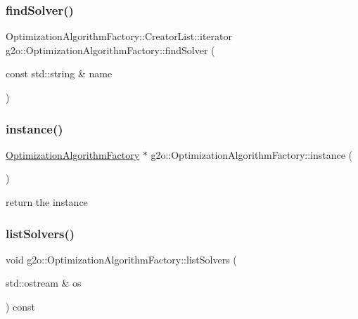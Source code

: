 \subsubsection{\texorpdfstring{find\+Solver()}{findSolver()}\hspace{0.1cm}{\footnotesize\ttfamily [2/2]}}
{\footnotesize\ttfamily Optimization\+Algorithm\+Factory\+::\+Creator\+List\+::iterator g2o\+::\+Optimization\+Algorithm\+Factory\+::find\+Solver (\begin{DoxyParamCaption}\item[{const std\+::string \&}]{name }\end{DoxyParamCaption})\hspace{0.3cm}{\ttfamily [protected]}}

\mbox{\label{classg2o_1_1_optimization_algorithm_factory_a4fe827a82f01c74ef124e7a9a9c98707}} 
\subsubsection{\texorpdfstring{instance()}{instance()}}
{\footnotesize\ttfamily \mbox{\hyperlink{classg2o_1_1_optimization_algorithm_factory}{Optimization\+Algorithm\+Factory}} $\ast$ g2o\+::\+Optimization\+Algorithm\+Factory\+::instance (\begin{DoxyParamCaption}{ }\end{DoxyParamCaption})\hspace{0.3cm}{\ttfamily [static]}}



return the instance 

\mbox{\label{classg2o_1_1_optimization_algorithm_factory_a89704fe7093e03eb4f2d568a1969bc45}} 
\subsubsection{\texorpdfstring{list\+Solvers()}{listSolvers()}}
{\footnotesize\ttfamily void g2o\+::\+Optimization\+Algorithm\+Factory\+::list\+Solvers (\begin{DoxyParamCaption}\item[{std\+::ostream \&}]{os }\end{DoxyParamCaption}) const}



